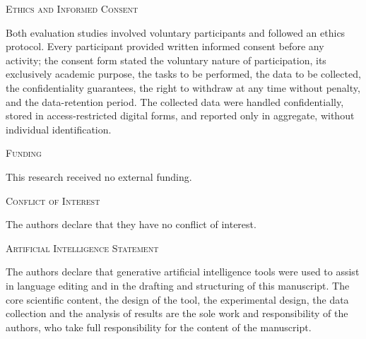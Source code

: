 \documentclass[10pt,journal,twoside,letterpaper]{IEEEtran}
\newcommand{\seccionfunding}[1]{%
	\vspace{0.6em}
	\noindent\textsc{Funding}
	\par\vspace{0.2em}
	\small #1
	\par
}
\newcommand{\seccionconflicto}[1]{%
	\vspace{0.6em}
	\noindent\textsc{Conflict of Interest}
	\par\vspace{0.2em}
	\small #1
	\par
}
\newcommand{\seccioniadeclaracion}[1]{%
	\vspace{0.6em}
	\noindent\textsc{Artificial Intelligence Statement}
	\par\vspace{0.2em}
	\small #1
	\par
}
\newcommand{\seccionetica}[1]{%
	\vspace{0.6em}
	\noindent\textsc{Ethics and Informed Consent}
	\par\vspace{0.2em}
	\small #1
	\par
}
\begin{document}
	\seccionetica{%
		Both evaluation studies involved voluntary participants and followed an ethics protocol. Every participant provided written informed consent before any activity; the consent form stated the voluntary nature of participation, its exclusively academic purpose, the tasks to be performed, the data to be collected, the confidentiality guarantees, the right to withdraw at any time without penalty, and the data-retention period. The collected data were handled confidentially, stored in access-restricted digital forms, and reported only in aggregate, without individual identification.
	}
	
	\seccionfunding{%
		This research received no external funding.
	}
	
	\seccionconflicto{%
		The authors declare that they have no conflict of interest.
	}
	
	\seccioniadeclaracion{%
		The authors declare that generative artificial intelligence tools were used to assist in language editing and in the drafting and structuring of this manuscript. The core scientific content, the design of the tool, the experimental design, the data collection and the analysis of results are the sole work and responsibility of the authors, who take full responsibility for the content of the manuscript.
	}
	
	
	
	
\end{document}
